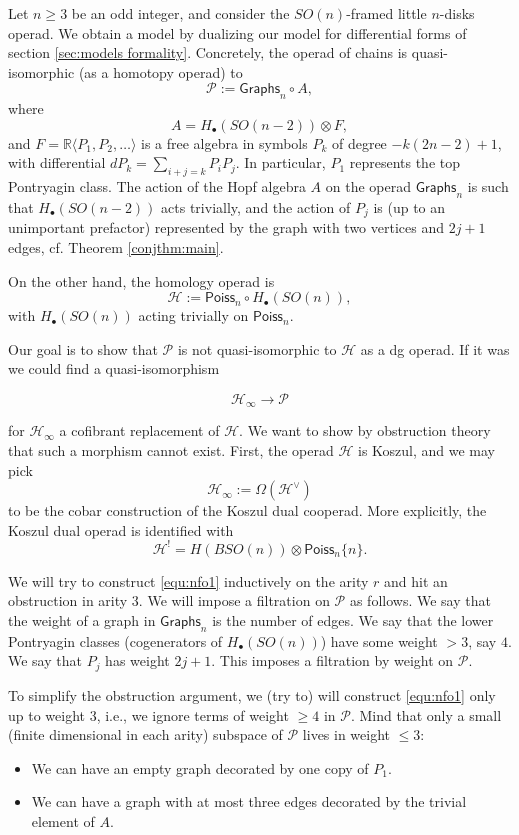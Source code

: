 \documentclass[a4paper]{amsart}
\theoremstyle{plain}
\theoremstyle{definition}
\newcommand{\R}{{\mathbb{R}}}
\newcommand{\Graphs}{{\mathsf{Graphs}}}
\newcommand{\Poiss}{{\mathsf{Poiss}}}
\newcommand{\op}{\mathcal}
\newcommand{\SO}{\mathit{SO}}
\newcommand{\beq}[1]{
\begin{equation}\label{#1}
}
\newcommand{\eeq}{
\end{equation}
}
\begin{document}
Let $n\geq 3$ be an odd integer, and consider the $\SO(n)$-framed little $n$-disks operad.
We obtain a model by dualizing our model for differential forms of section \ref{sec:models formality}.
Concretely, the operad of chains is quasi-isomorphic (as a homotopy operad) to 
\[
 \op P := \Graphs_n \circ A,
\]
where 
\[
 A=H_\bullet(\SO(n-2)) \otimes F,
\]
and $F=\R\langle P_1,P_2,\dots \rangle$ is a free algebra in symbols $P_k$ of degree $-k(2n-2)+1$, with differential $dP_k=\sum_{i+j=k}P_iP_j$.
In particular, $P_1$ represents the top Pontryagin class.
The action of the Hopf algebra $A$ on the operad $\Graphs_n$ is such that $H_\bullet(\SO(n-2))$ acts trivially, and the action of $P_j$ is (up to an unimportant prefactor) represented by the graph with two vertices and $2j+1$ edges, cf. Theorem \ref{conjthm:main}.

On the other hand, the homology operad is \cite{SW}
\[
 \op H := \Poiss_n \circ H_\bullet(\SO(n)),
\]
with $H_\bullet(\SO(n))$ acting trivially on $\Poiss_n$.

Our goal is to show that $\op P$ is not quasi-isomorphic to $\op H$ as a dg operad.
If it was we could find a quasi-isomorphism
\beq{equ:nfo1}
 \op H_\infty \to \op P
\eeq
for $\op H_\infty$ a cofibrant replacement of $\op H$.
We want to show by obstruction theory that such a morphism cannot exist.
First, the operad $\op H$ is Koszul, and we may pick 
\[
 \op H_\infty := \Omega(\op H^{\vee})
\]
to be the cobar construction of the Koszul dual cooperad.
More explicitly, the Koszul dual operad is identified with 
\[
 \op H^! = H(B\SO(n)) \otimes \Poiss_n\{n\}.
\]

We will try to construct \eqref{equ:nfo1} inductively on the arity $r$ and hit an obstruction in arity 3.
We will impose a filtration on $\op P$ as follows.
We say that the weight of a graph in $\Graphs_n$ is the number of edges.
We say that the lower Pontryagin classes (cogenerators of $H_\bullet(\SO(n))$) have some weight $>3$, say $4$.
We say that $P_j$ has weight $2j+1$.
This imposes a filtration by weight on $\op P$. 

To simplify the obstruction argument, we (try to) will construct \eqref{equ:nfo1} only up to weight 3, i.e., we ignore terms of weight $\geq 4$ in $\op P$.
Mind that only a small (finite dimensional in each arity) subspace of $\op P$ lives in weight $\leq 3$:
\begin{itemize}
 \item We can have an empty graph decorated by one copy of $P_1$.
\item We can have a graph with at most three edges decorated by the trivial element of $A$.
\end{itemize}
\end{document}
